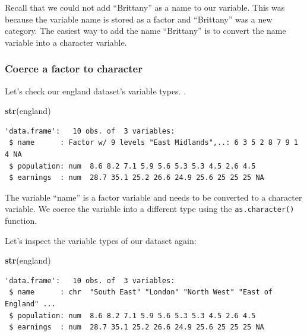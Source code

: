 \documentclass[]{article}
\newenvironment{Shaded}{\begin{snugshade}}{\end{snugshade}}
\newcommand{\KeywordTok}[1]{\textcolor[rgb]{0.13,0.29,0.53}{\textbf{#1}}}
\newcommand{\NormalTok}[1]{#1}
\newcommand{\OperatorTok}[1]{\textcolor[rgb]{0.81,0.36,0.00}{\textbf{#1}}}
\newcommand{\StringTok}[1]{\textcolor[rgb]{0.31,0.60,0.02}{#1}}
\begin{document}
Recall that we could not add ``Brittany'' as a name to our variable. This was because the variable name is stored as a factor and ``Brittany'' was a new category. The easiest way to add the name ``Brittany'' is to convert the name variable into a character variable.

\hypertarget{coerce-a-factor-to-character}{%
\subsubsection{Coerce a factor to character}\label{coerce-a-factor-to-character}}

Let's check our england dataset's variable types.
.

\begin{Shaded}
\begin{Highlighting}[]
\KeywordTok{str}\NormalTok{(england)}
\end{Highlighting}
\end{Shaded}

\begin{verbatim}
'data.frame':   10 obs. of  3 variables:
 $ name      : Factor w/ 9 levels "East Midlands",..: 6 3 5 2 8 7 9 1 4 NA
 $ population: num  8.6 8.2 7.1 5.9 5.6 5.3 5.3 4.5 2.6 4.5
 $ earnings  : num  28.7 35.1 25.2 26.6 24.9 25.6 25 25 25 NA
\end{verbatim}

The variable ``name'' is a factor variable and needs to be converted to a character variable. We coerce the variable into a different type using the \texttt{as.character()} function.

\begin{Shaded}
\end{Shaded}

Let's inspect the variable types of our dataset again:

\begin{Shaded}
\begin{Highlighting}[]
\KeywordTok{str}\NormalTok{(england)}
\end{Highlighting}
\end{Shaded}

\begin{verbatim}
'data.frame':   10 obs. of  3 variables:
 $ name      : chr  "South East" "London" "North West" "East of England" ...
 $ population: num  8.6 8.2 7.1 5.9 5.6 5.3 5.3 4.5 2.6 4.5
 $ earnings  : num  28.7 35.1 25.2 26.6 24.9 25.6 25 25 25 NA
\end{verbatim}
\end{document}
